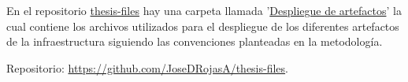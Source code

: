 \newpage
{}\label{appendix:Archivos de despliegue}

\noindent En el repositorio \href{https://github.com/JoseDRojasA/thesis-files}{thesis-files} hay una carpeta llamada '\href{https://github.com/JoseDRojasA/thesis-files/tree/master/Despliegue de artefactos}{Despliegue de artefactos}' la cual contiene los archivos utilizados para el despliegue de los diferentes artefactos de la infraestructura siguiendo las convenciones planteadas en la metodolog\'ia.

Repositorio: \url{https://github.com/JoseDRojasA/thesis-files}.